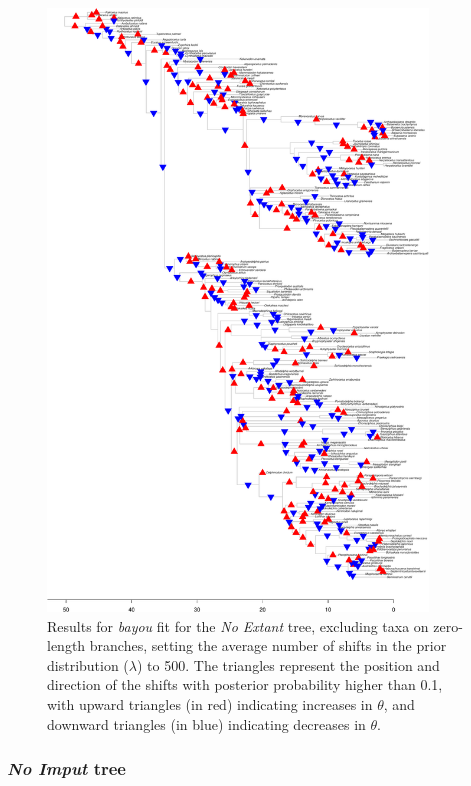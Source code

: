 \begin{figure}[H]
\includegraphics[width=0.9\textwidth]{img/plots-noextant-k500-1.pdf}
\caption{Results for \textit{bayou} fit for the \textit{No Extant} tree, excluding taxa on zero-length branches, setting the average number of shifts in the prior distribution ($\lambda$) to 500. The triangles represent the position and direction of the shifts with posterior probability higher than 0.1, with upward triangles (in red) indicating increases in $\theta$, and downward triangles (in blue) indicating decreases in $\theta$.}
\label{fig:extant-k500-nzlb}
\end{figure}

\newpage

\subsubsection{\textit{No Imput} tree}

